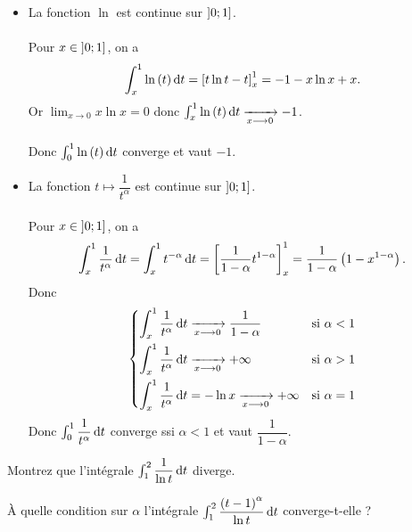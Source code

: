 \begin{dem}
\begin{itemize}
    \item La fonction \(\ln\) est continue sur \(\left]0;1\right]\). \\\\ Pour \(x\in\left]0;1\right]\), on a \[\int_x^1\ln\paren{t}\odif{t}=\croch{t\ln t-t}_x^1=-1-x\ln x+x.\] Or \(\lim_{x\to0}x\ln x=0\) donc \(\int_x^1\ln\paren{t}\odif{t}\tendqd{x\to0}-1\). \\\\ Donc \(\int_0^1\ln\paren{t}\odif{t}\) converge et vaut \(-1\). \\
    \item La fonction \(t\mapsto\dfrac{1}{t^\alpha}\) est continue sur \(\left]0;1\right]\). \\\\ Pour \(x\in\left]0;1\right]\), on a \[\int_x^1\dfrac{1}{t^\alpha}\odif{t}=\int_x^1t^{-\alpha}\odif{t}=\croch{\dfrac{1}{1-\alpha}t^{1-\alpha}}_x^1=\dfrac{1}{1-\alpha}\paren{1-x^{1-\alpha}}.\] Donc \[\begin{dcases}
        \int_x^1\dfrac{1}{t^\alpha}\odif{t}\tendqd{x\to0}\dfrac{1}{1-\alpha} &\text{si }\alpha<1 \\
        \int_x^1\dfrac{1}{t^\alpha}\odif{t}\tendqd{x\to0}\pinf &\text{si }\alpha>1 \\
        \int_x^1\dfrac{1}{t^\alpha}\odif{t}=-\ln x\tendqd{x\to0}\pinf &\text{si }\alpha=1
    \end{dcases}\] Donc \(\int_0^1\dfrac{1}{t^\alpha}\odif{t}\) converge ssi \(\alpha<1\) et vaut \(\dfrac{1}{1-\alpha}\).
\end{itemize}
\end{dem}

\begin{exo}
Montrez que l'intégrale \(\int_1^2\dfrac{1}{\ln t}\odif{t}\) diverge.

À quelle condition sur \(\alpha\) l'intégrale \(\int_1^2\dfrac{\paren{t-1}^\alpha}{\ln t}\odif{t}\) converge-t-elle ?
\end{exo}

